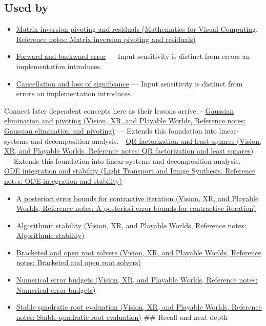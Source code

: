 \subsection{Used by}\label{appendix-8f6a01f284a7-used-by}

\begin{itemize}
\item
  \href{../02-Mathematics-for-Visual-Computing/main.pdf\#nameddest=appendix-48d2e66378ab}{Matrix inversion pivoting and residuals (Mathematics for Visual Computing, Reference notes: Matrix inversion pivoting and residuals)}
\item
  \hyperref[appendix-a7fbaf6d1b1c]{Forward and backward error} --- Input sensitivity is distinct from errors an implementation introduces.
\item
  \hyperref[appendix-a2773a6a2f9d]{Cancellation and loss of significance} --- Input sensitivity is distinct from errors an implementation introduces.
\end{itemize}

Connect later dependent concepts here as their lessons arrive. - \href{../07-Vision-XR-and-Playable-Worlds/main.pdf\#nameddest=appendix-f6e77f4a200f}{Gaussian elimination and pivoting (Vision, XR, and Playable Worlds, Reference notes: Gaussian elimination and pivoting)} --- Extends this foundation into linear-systems and decomposition analysis. - \href{../07-Vision-XR-and-Playable-Worlds/main.pdf\#nameddest=appendix-c3421e6b4f2c}{QR factorization and least squares (Vision, XR, and Playable Worlds, Reference notes: QR factorization and least squares)} --- Extends this foundation into linear-systems and decomposition analysis. - \href{../04-Light-Transport-and-Image-Synthesis/main.pdf\#nameddest=appendix-18eacf61a04b}{ODE integration and stability (Light Transport and Image Synthesis, Reference notes: ODE integration and stability)}

\begin{itemize}
\tightlist
\item
  \href{../07-Vision-XR-and-Playable-Worlds/main.pdf\#nameddest=appendix-d83b0ad1be7f}{A posteriori error bounds for contractive iteration (Vision, XR, and Playable Worlds, Reference notes: A posteriori error bounds for contractive iteration)}
\item
  \href{../07-Vision-XR-and-Playable-Worlds/main.pdf\#nameddest=appendix-aa2bf0d79639}{Algorithmic stability (Vision, XR, and Playable Worlds, Reference notes: Algorithmic stability)}
\item
  \href{../07-Vision-XR-and-Playable-Worlds/main.pdf\#nameddest=appendix-f63eb850796d}{Bracketed and open root solvers (Vision, XR, and Playable Worlds, Reference notes: Bracketed and open root solvers)}
\item
  \href{../07-Vision-XR-and-Playable-Worlds/main.pdf\#nameddest=appendix-31b8c295e05f}{Numerical error budgets (Vision, XR, and Playable Worlds, Reference notes: Numerical error budgets)}
\item
  \href{../07-Vision-XR-and-Playable-Worlds/main.pdf\#nameddest=appendix-b9afba7f63e5}{Stable quadratic root evaluation (Vision, XR, and Playable Worlds, Reference notes: Stable quadratic root evaluation)} \#\# Recall and next depth
\end{itemize}

